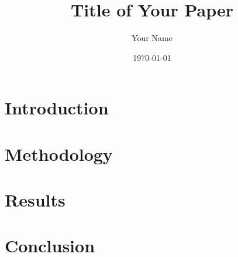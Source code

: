\documentclass{article}
\begin{document}
\title{Title of Your Paper}
\author{Your Name}
\date{\today}

\maketitle

\section{Introduction}

\section{Methodology}

\section{Results}

\section{Conclusion}
\end{document}
